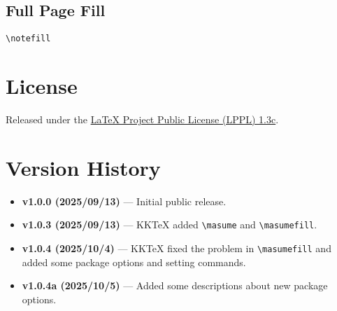 \documentclass[a4paper,12pt]{article}
\begin{document}
\subsection{Full Page Fill}
\begin{verbatim}
\notefill
\end{verbatim}
\notefill\newpage

\section{License}

Released under the \href{https://www.latex-project.org/lppl/}{LaTeX Project Public License (LPPL) 1.3c}.

\section{Version History}

\begin{itemize}
    \item \textbf{v1.0.0 (2025/09/13)} --- Initial public release.
    \item \textbf{v1.0.3 (2025/09/13)} --- KKTeX added \texttt{\textbackslash masume} and \texttt{\textbackslash masumefill}.
    \item \textbf{v1.0.4 (2025/10/4)} --- KKTeX fixed the problem in \verb|\masumefill| and added some package options and setting commands.
    \item \textbf{v1.0.4a (2025/10/5)} --- Added some descriptions about new package options.
\end{itemize}
\end{document}
